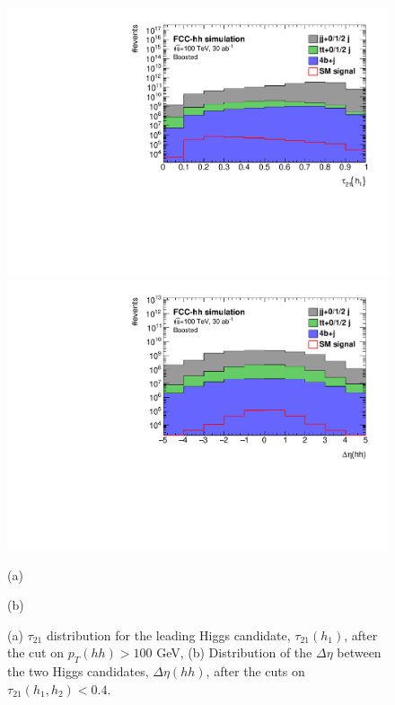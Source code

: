 \begin{figure}
	\centering
	\begin{minipage}{.5\textwidth}
		\centering
		\includegraphics[width=\linewidth]{./images/hist_h1_tau21_stack.pdf}
	\end{minipage}%
	\begin{minipage}{.5\textwidth}
		\centering
		\includegraphics[width=\linewidth]{./images/hist_hh_deltaEta_stack.pdf}
	\end{minipage}
	\begin{minipage}[t]{0.5\textwidth}
		\caption*{(a)}
	\end{minipage}%
	\hfill
	\begin{minipage}[t]{0.5\textwidth}
		\caption*{(b)}
	\end{minipage}
	\caption{(a) $\tau_{21}$ distribution for the leading Higgs candidate, $\tau_{21}(h_1)$, after the cut on $p_T(hh)>100$ GeV, (b) Distribution of the $\Delta\eta$ between the two Higgs candidates, $\Delta\eta(hh)$, after the cuts on $\tau_{21}(h_1,h_2)<0.4$.}
	\label{fig:sub_stack}
\end{figure}

